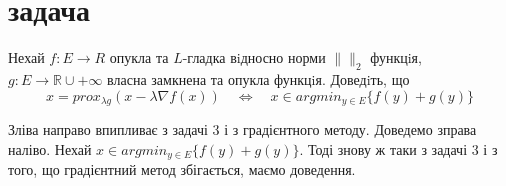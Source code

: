 \section{задача}

\begin{tcolorbox}[title=Умова]
    Нехай $f : E \rightarrow R $ опукла та $L$-гладка вiдносно норми 
    $\|  \|_2$ функцiя, $g : E \rightarrow \mathbb{R} \cup {+\infty} $ 
    власна замкнена та опукла функцiя. Доведiть, що
    $$ x = prox_{\lambda g}(x - \lambda \nabla f(x)) \quad 
    \Leftrightarrow \quad x \in argmin_{y \in E} \{f(y) + g(y)\} $$
\end{tcolorbox}


Зліва направо впипливає з задачі 3 і з градієнтного методу. 
Доведемо зправа наліво. Нехай $x \in argmin_{y \in E} \{f(y) + g(y)\}$. 
Тоді знову ж таки з задачі 3 і з того, що градієнтний метод збігається, маємо доведення.